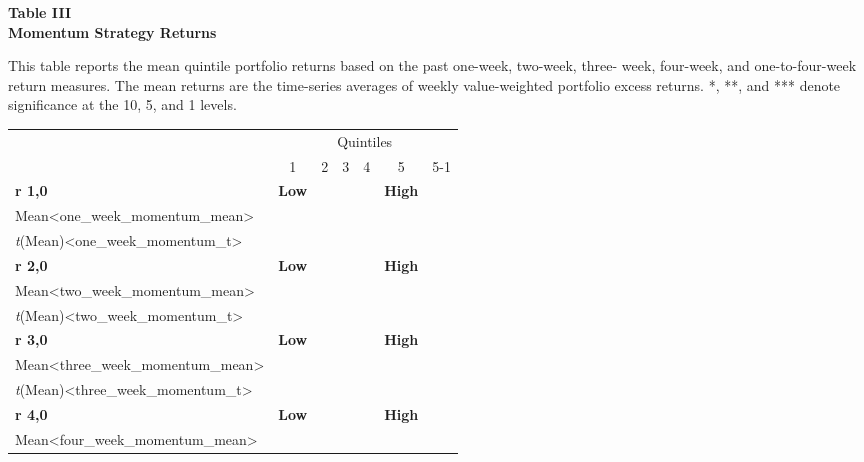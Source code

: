 \documentclass{article}
\begin{document}
    \begin{center}
        \textbf{
        Table III
        \\
        Momentum Strategy Returns
        }
        \begin{justify}
            \footnotesize{
                This table reports the mean quintile portfolio returns based on the past one-week, two-week, three- week, four-week, and one-to-four-week return measures. The mean returns are the time-series averages of weekly value-weighted portfolio excess returns. *, **, and *** denote significance at the 10, 5, and 1 levels.
            }
        \end{justify}
        \-
        \begin{tabular}{lcccccr}
            \toprule
            \multicolumn{1}{c}{} & \multicolumn{6}{c}{Quintiles}
            \\
            \cmidrule(lr){2-7}
            & 1 & 2 & 3 & 4 & 5 & 5-1
            \\
            \midrule
            \multicolumn{1}{l}{\textbf{r 1,0}} & \multicolumn{1}{c}{\textbf{Low}} & \multicolumn{3}{c}{} & \multicolumn{1}{c}{\textbf{High}}
            \\
            Mean<one_week_momentum_mean>
            \\
            \textit{t}(Mean)<one_week_momentum_t>
            \\ [0.2cm]
            \multicolumn{1}{l}{\textbf{r 2,0}} & \multicolumn{1}{c}{\textbf{Low}} & \multicolumn{3}{c}{} & \multicolumn{1}{c}{\textbf{High}}
            \\
            Mean<two_week_momentum_mean>
            \\
            \textit{t}(Mean)<two_week_momentum_t>
            \\ [0.2cm]
            \multicolumn{1}{l}{\textbf{r 3,0}} & \multicolumn{1}{c}{\textbf{Low}} & \multicolumn{3}{c}{} & \multicolumn{1}{c}{\textbf{High}}
            \\
            Mean<three_week_momentum_mean>
            \\
            \textit{t}(Mean)<three_week_momentum_t>
            \\ [0.2cm]
            \multicolumn{1}{l}{\textbf{r 4,0}} & \multicolumn{1}{c}{\textbf{Low}} & \multicolumn{3}{c}{} & \multicolumn{1}{c}{\textbf{High}}
            \\
            Mean<four_week_momentum_mean>
            \\

\end{tabular}
\end{center}
\end{document}
